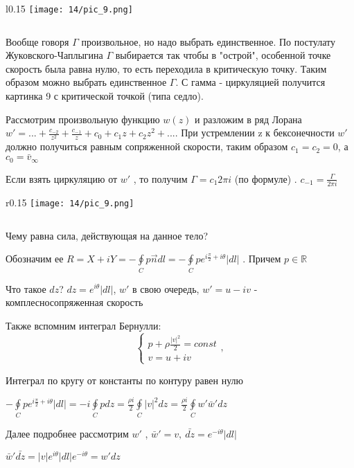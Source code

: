 \begin{wrapfigure}{l}{0.15\textwidth}
	\texttt{[image: 14/pic\_9.png]}
	\caption{\label{ris:image14.9}}
\end{wrapfigure}
$$ $$

Вообще говоря $\Gamma$ произвольное, но надо выбрать единственное. По постулату Жуковского-Чаплыгина $\Gamma$ выбирается так чтобы в "острой", особенной точке скорость была равна нулю, то есть переходила в критическую точку. Таким образом можно выбрать единственное $\Gamma$. С гамма - циркуляцией получится картинка 9 с критической точкой (типа седло).

\newpage
Рассмотрим произвольную функцию $w(z)$ и разложим в ряд Лорана $w' = ... + \frac{c_{-2}}{z^2} + \frac{c_{-1}}{z} + c_0 + c_1 z + c_2 z^2 + ... $. При устремлении z к бексонечности $w'$ должно получиться равным сопряженной скорости, таким образом $c_1 = c_2 = 0$, а $c_0 = \bar{v}_{\infty}$

Если взять циркуляцию от $w'$ , то получим $\Gamma = c_1 2 \pi i $ (по формуле) . $c_{-1} = \frac{\Gamma}{2 \pi i}$

\begin{wrapfigure}{r}{0.15\textwidth}
	\texttt{[image: 14/pic\_9.png]}
	\caption{\label{ris:image14.10}}
\end{wrapfigure}
$$ $$

Чему равна сила, действующая на данное тело? 

Обозначим ее $R = X + i Y = - 	\oint \limits_{C} p \overrightarrow{n} dl = - \oint \limits_{C} p e^{i\frac{\pi}{2} + i\theta} |dl|$ . Причем $p \in \mathbb{R}$

Что такое $dz$? $dz = e^{i \theta} |dl |$, $w'$  в свою очередь, $w' = u -i v$ -  комплесносопряженная скорость 

Также вспомним интеграл Бернулли:
$$ \begin{cases}
	p + \rho \frac{|v|^2}{2} = const \\
	v = u + i v
\end{cases},$$

Интеграл по кругу от константы по контуру равен нулю 

$- \oint \limits_{C} p e^{i\frac{\pi}{2} + i\theta} |dl| = -i \oint  \limits_{C} p dz = \frac{\rho i}{2} \oint  \limits_{C} |v|^2 dz =  \frac{\rho i}{2} \oint  \limits_{C} w' \bar{w}' d z$

Далее подробнее рассмотрим $w'$ , $\bar{w}' = v, \ \bar{dz} = e^{-i \theta} |dl|$

$\bar{w}' \bar{dz} = |v| e^{i \theta} |dl| e^{-i \theta} = w' dz$

